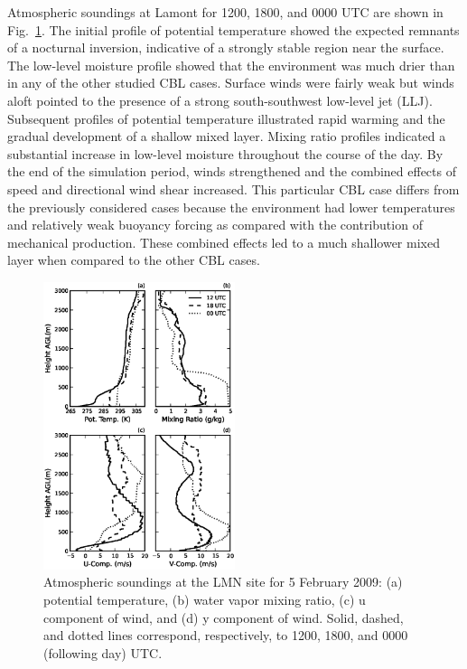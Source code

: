 Atmospheric soundings at Lamont for 1200, 1800, and 0000 UTC are shown in Fig.~\ref{figure427}. The initial profile of potential temperature showed the expected remnants of a nocturnal inversion, indicative of a strongly stable region near the surface. The low-level moisture profile showed that the environment was much drier than in any of the other studied CBL cases. Surface winds were fairly weak but winds aloft pointed to the presence of a strong south-southwest low-level jet (LLJ). Subsequent profiles of potential temperature illustrated rapid warming and the gradual development of a shallow mixed layer. Mixing ratio profiles indicated a substantial increase in low-level moisture throughout the course of the day. By the end of the simulation period, winds strengthened and the combined effects of speed and directional wind shear increased. This particular CBL case differs from the previously considered cases because the environment had lower temperatures and relatively weak buoyancy forcing as compared with the contribution of mechanical production. These combined effects led to a much shallower mixed layer when compared to the other CBL cases.


\begin{figure}[H]
\begin{center}
\includegraphics[width=0.5\textwidth]{figures/chapter4/20090205_lmnsounding}
\end{center}
\caption{Atmospheric soundings at the LMN site for 5 February 2009: (a) potential temperature, (b) water vapor mixing ratio, (c) u component of wind, and (d) y component of wind. Solid, dashed, and dotted lines correspond, respectively, to 1200, 1800, and 0000 (following day) UTC.}
\label{figure427}
\end{figure}


